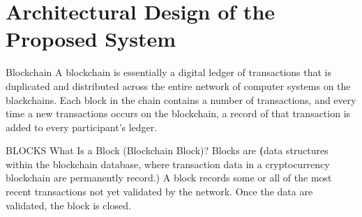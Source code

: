 \documentclass{beamer}
\begin{document}
	\section{Architectural Design of the Proposed System}
	\begin{frame}{Blockchain}
	\bigskip
	\normalsize
	A blockchain is essentially a digital ledger of transactions that is duplicated and distributed across the entire network of computer systems on the blackchains. Each block in the chain contains a number of transactions, and every time a new transactions occurs on the blockchain, a record of that transaction is added to every participant's ledger. 
	\end{frame}

	\begin{frame}{BLOCKS}
	\bigskip
	\normalsize
	What Is a Block (Blockchain Block)? Blocks are \textbf(data structures within the blockchain database, where transaction data in a cryptocurrency blockchain are permanently record.) A block records some or all of the most recent transactions not yet validated by the network. Once the data are validated, the block is closed.
	\end{frame}
\end{document}
